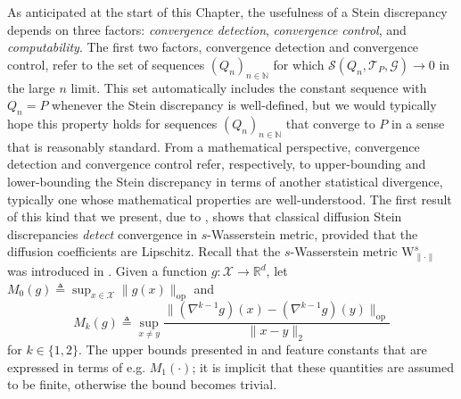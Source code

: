 \documentclass[12pt,paper=letter]{scrreprt}
\def\defeq{\triangleq} %
\begin{document}
As anticipated at the start of this Chapter, the usefulness of a Stein discrepancy depends on three factors: \emph{convergence detection}, \emph{convergence control}, and \emph{computability}. %
The first two factors, convergence detection and convergence control, refer to the set of sequences $(Q_n)_{n \in \mathbb{N}}$ for which $\mathcal{S}(Q_n,\mathcal{T}_P,\mathcal{G}) \rightarrow 0$ in the large $n$ limit.
This set automatically includes the constant sequence with $Q_n = P$ whenever the Stein discrepancy is well-defined, but we would typically hope this property holds for sequences $(Q_n)_{n \in \mathbb{N}}$ that converge to $P$ in a sense that is reasonably standard. 
From a mathematical perspective, convergence detection and convergence control refer, respectively, to upper-bounding and lower-bounding the Stein discrepancy in terms of another statistical divergence, typically one whose mathematical properties are well-understood.
The first result of this kind that we present, due to \citet{Gorham2019}, shows that classical diffusion Stein discrepancies \emph{detect} convergence in $s$-Wasserstein metric, provided that the diffusion coefficients are Lipschitz. 
Recall that the $s$-Wasserstein metric $\mathrm{W}_{\|\cdot\|}^s$ was introduced in .
Given a function $g : \mathcal{X} \rightarrow \mathbb{R}^d$, let $M_0(g) \defeq  \sup_{x \in \mathcal{X}} \|g(x)\|_{\mathrm{op}}$ and 
$$
M_k(g) \defeq \sup_{x \neq y} \frac{ \|(\nabla^{k-1} g)(x) - (\nabla^{k-1} g)(y)\|_{\mathrm{op}}}{\|x-y\|_2} 
$$
for $k \in \{1,2\}$.
The upper bounds presented in  and  feature constants that are expressed in terms of e.g. $M_1(\cdot)$; it is implicit that these quantities are assumed to be finite, otherwise the bound becomes trivial. 
\end{document}
